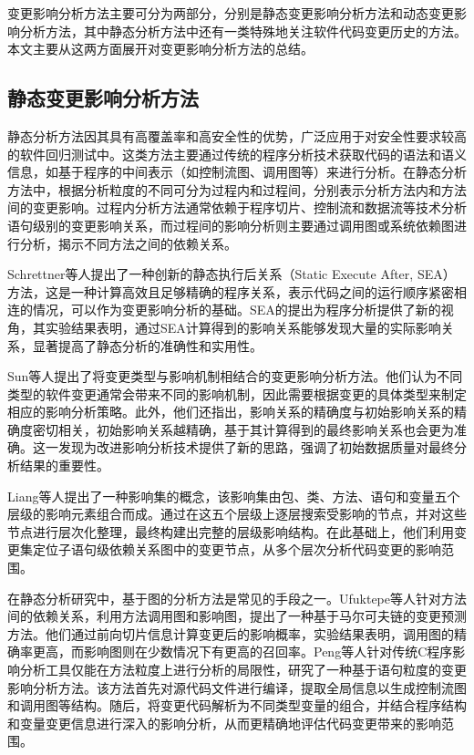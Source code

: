 变更影响分析方法主要可分为两部分，分别是静态变更影响分析方法和动态变更影响分析方法，其中静态分析方法中还有一类特殊地关注软件代码变更历史的方法。本文主要从这两方面展开对变更影响分析方法的总结。


\subsection{静态变更影响分析方法}

静态分析方法因其具有高覆盖率和高安全性的优势，广泛应用于对安全性要求较高的软件回归测试中。这类方法主要通过传统的程序分析技术获取代码的语法和语义信息，如基于程序的中间表示（如控制流图、调用图等）来进行分析。在静态分析方法中，根据分析粒度的不同可分为过程内和过程间，分别表示分析方法内和方法间的变更影响。过程内分析方法通常依赖于程序切片、控制流和数据流等技术\cite{2004Efficient,1991Using}分析语句级别的变更影响关系，而过程间的影响分析则主要通过调用图或系统依赖图进行分析，揭示不同方法之间的依赖关系\cite{JitenderKumarChhabra2018Improved, 2011An, 2013Analyzing}。

Schrettner等人\cite{Department2013Impact}提出了一种创新的静态执行后关系（Static Execute After, SEA）方法，这是一种计算高效且足够精确的程序关系，表示代码之间的运行顺序紧密相连的情况，可以作为变更影响分析的基础。SEA的提出为程序分析提供了新的视角，其实验结果表明，通过SEA计算得到的影响关系能够发现大量的实际影响关系，显著提高了静态分析的准确性和实用性。

Sun等人\cite{5676283}提出了将变更类型与影响机制相结合的变更影响分析方法。他们认为不同类型的软件变更通常会带来不同的影响机制，因此需要根据变更的具体类型来制定相应的影响分析策略。此外，他们还指出，影响关系的精确度与初始影响关系的精确度密切相关，初始影响关系越精确，基于其计算得到的最终影响关系也会更为准确。这一发现为改进影响分析技术提供了新的思路，强调了初始数据质量对最终分析结果的重要性。

Liang等人\cite{10430003}提出了一种影响集的概念，该影响集由包、类、方法、语句和变量五个层级的影响元素组合而成。通过在这五个层级上逐层搜索受影响的节点，并对这些节点进行层次化整理，最终构建出完整的层级影响结构。在此基础上，他们利用变更集定位子语句级依赖关系图中的变更节点，从多个层次分析代码变更的影响范围。

在静态分析研究中，基于图的分析方法是常见的手段之一。Ufuktepe等人\cite{2021Code}针对方法间的依赖关系，利用方法调用图和影响图，提出了一种基于马尔可夫链的变更预测方法。他们通过前向切片信息计算变更后的影响概率，实验结果表明，调用图的精确率更高，而影响图则在少数情况下有更高的召回率。Peng等人\cite{2022An}针对传统C程序影响分析工具仅能在方法粒度上进行分析的局限性，研究了一种基于语句粒度的变更影响分析方法。该方法首先对源代码文件进行编译，提取全局信息以生成控制流图和调用图等结构。随后，将变更代码解析为不同类型变量的组合，并结合程序结构和变量变更信息进行深入的影响分析，从而更精确地评估代码变更带来的影响范围。

